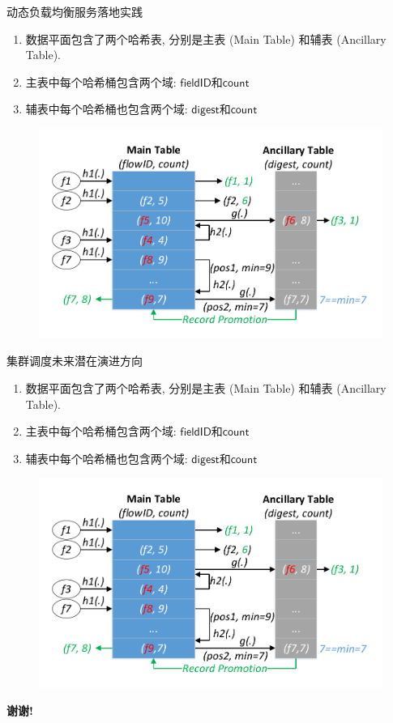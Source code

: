 \documentclass{beamer}
\newcommand{\field}{\mathsf}
\begin{document}
\begin{frame}{动态负载均衡服务落地实践}
\begin{enumerate}
\item 数据平面包含了两个哈希表, 分别是主表 (Main Table) 和辅表 (Ancillary Table).
\item 主表中每个哈希桶包含两个域: $\field{fieldID}$和$\field{count}$
\item 辅表中每个哈希桶也包含两个域: $\field{digest}$和$\field{count}$
\end{enumerate}
\begin{figure}
	\centering
	\includegraphics[width=0.6\linewidth]{figures/representation/datastructure}
\end{figure}

\end{frame}

\begin{frame}{集群调度未来潜在演进方向}
\begin{enumerate}
\item 数据平面包含了两个哈希表, 分别是主表 (Main Table) 和辅表 (Ancillary Table).
\item 主表中每个哈希桶包含两个域: $\field{fieldID}$和$\field{count}$
\item 辅表中每个哈希桶也包含两个域: $\field{digest}$和$\field{count}$
\end{enumerate}
\begin{figure}
	\centering
	\includegraphics[width=0.6\linewidth]{figures/representation/datastructure}
\end{figure}

\end{frame}

  
\begin{frame}{}
\begin{center}
    \textbf{谢谢!}
\end{center}
\end{frame}
\end{document}
